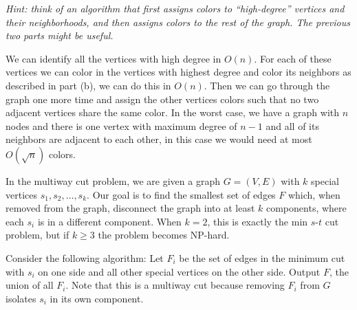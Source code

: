 \documentclass[11pt]{article}
\begin{document}
\begin{subparts}
    \emph{Hint: think of an algorithm that first assigns colors to ``high-degree'' vertices and their neighborhoods, and then assigns colors to the rest of the graph.  The previous two parts might be useful.}\\
    \begin{solution}
        We can identify all the vertices with high degree in $O(n)$. For each of these vertices we can
        color in the vertices with highest degree and color its neighbors as described in part (b), we can do this in $O(n)$. Then we can go through the 
        graph one more time and assign the other vertices colors such that no two adjacent vertices share the same
        color. In the worst case, we have a graph with $n$ nodes and there is one vertex with maximum degree of $n-1$ and all of 
        its neighbors are adjacent to each other, in this case we would need at most $O(\sqrt{n})$ colors.
    \end{solution}
\end{subparts}

\newpage

In the multiway cut problem, we are given a graph $G=(V, E)$ with $k$ special vertices $s_1, s_2, \ldots, s_k$. Our goal is to find the smallest set of edges $F$ which, when removed from the graph, disconnect the graph into at least $k$ components, where each $s_i$ is in a different component. When $k = 2$, this is exactly the min $s$-$t$ cut problem, but if $k \geq 3$ the problem becomes NP-hard.

Consider the following algorithm: Let $F_i$ be the set of edges in the minimum cut with $s_i$ on one side and all other special vertices on the other side. Output $F$, the union of all $F_i$. Note that this is a multiway cut because removing $F_i$ from $G$ isolates $s_i$ in its own component.
\end{document}

